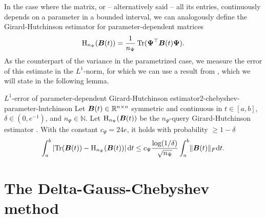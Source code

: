 In the case where the matrix, or -- alternatively said -- all its entries, continuously depends on a
parameter in a bounded interval, we can analogously define the Girard-Hutchinson
estimator for parameter-dependent matrices
\begin{equation}
    \operatorname{H}_{n_{\Psi}}(\boldsymbol{B}(t)) = \frac{1}{n_{\Psi}} \operatorname{Tr}(\boldsymbol{\Psi}^{\top} \boldsymbol{B}(t) \boldsymbol{\Psi}).
    \label{equ:2-chebyshev-DGC-hutchionson-estimator-parameter}
\end{equation}
As the counterpart of the variance in the parametrized case, we measure the
error of this estimate in the $L^1$-norm, for which we can use a result
from \cite{he2023parameter}, which we will state in the following lemma.
\begin{lemma}{$L^1$-error of parameter-dependent Girard-Hutchinson estimator}{2-chebyshev-parameter-hutchinson}
    Let $\boldsymbol{B}(t) \in \mathbb{R}^{n \times n}$ symmetric and continuous in
    $t \in [a, b]$, $\delta \in (0, e^{-1})$, and $n_{\Psi} \in \mathbb{N}$.
    Let $\operatorname{H}_{n_{\Psi}}(\boldsymbol{B}(t))$ be the $n_{\Psi}$-query
    Girard-Hutchinson estimator .
    With the constant $c_{\Psi} = 24e$, it holds with probability $\geq 1 - \delta$
    \begin{equation}
        \int_{a}^{b} \left| \operatorname{Tr}(\boldsymbol{B}(t)) - \operatorname{H}_{n_{\Psi}}(\boldsymbol{B}(t)) \right| \mathrm{d}t \leq c_{\Psi} \frac{\log(1/\delta)}{\sqrt{n_{\Psi}}} \int_{a}^{b} \lVert \boldsymbol{B}(t) \rVert _F \mathrm{d}t.
    \end{equation}
\end{lemma}


\section{The Delta-Gauss-Chebyshev method}
\label{sec:2-chebyshev-delta-gauss-chebyshev}

